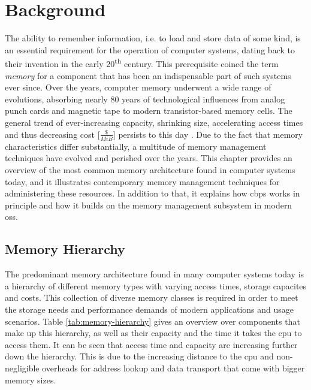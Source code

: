 \chapter{Background}
\label{chap:background}

The ability to remember information, i.e. to load and store data of some kind, is an essential requirement for the operation of computer systems, dating back to their invention in the early 20\textsuperscript{th} century.
This prerequisite coined the term \emph{memory} for a component that has been an indispensable part of such systems ever since.
Over the years, computer memory underwent a wide range of evolutions, absorbing nearly 80 years of technological influences from analog punch cards and magnetic tape to modern transistor-based memory cells.
The general trend of ever-increasing capacity, shrinking size, accelerating access times and thus decreasing cost [\emph{$\frac{\$}{MiB}$}] persists to this day \cite{memory-price}.
Due to the fact that memory characteristics differ substantially, a multitude of memory management techniques have evolved and perished over the years.
This chapter provides an overview of the most common memory architecture found in computer systems today, and it illustrates contemporary memory management techniques for administering these resources.
In addition to that, it explains how \ac{cbps} works in principle and how it builds on the memory management subsystem in modern \acp{os}.

\section{Memory Hierarchy}
\label{sec:memory-hierarchy}

The predominant memory architecture found in many computer systems today is a hierarchy of different memory types with varying access times, storage capacites and costs.
This collection of diverse memory classes is required in order to meet the storage needs and performance demands of modern applications and usage scenarios.
Table \ref{tab:memory-hierarchy} gives an overview over components that make up this hierarchy, as well as their capacity and the time it takes the \ac{cpu} to access them.
It can be seen that access time and capacity are increasing further down the hierarchy.
This is due to the increasing distance to the \ac{cpu} and non-negligible overheads for address lookup and data transport that come with bigger memory sizes.

